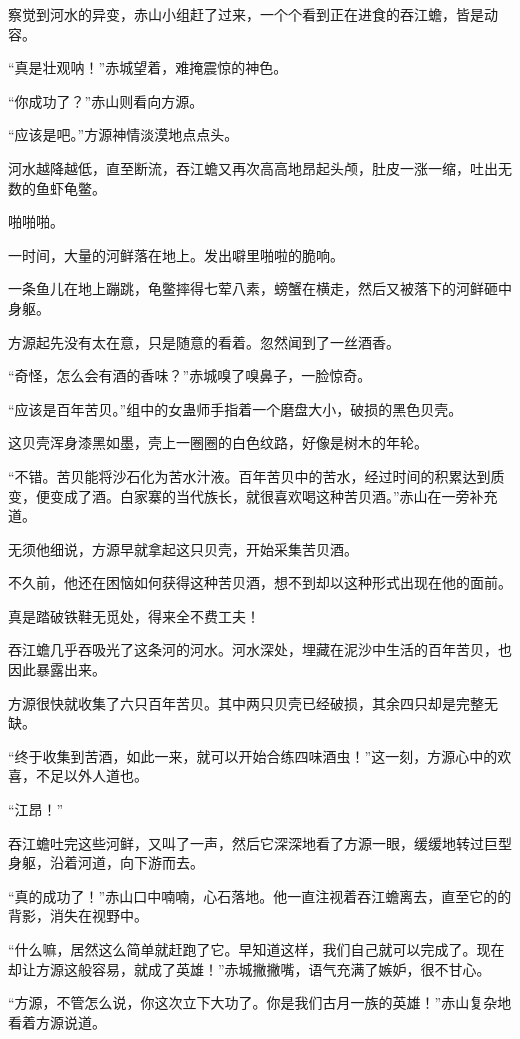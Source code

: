 \begin{this_body}
察觉到河水的异变，赤山小组赶了过来，一个个看到正在进食的吞江蟾，皆是动容。

“真是壮观呐！”赤城望着，难掩震惊的神色。

“你成功了？”赤山则看向方源。

“应该是吧。”方源神情淡漠地点点头。

河水越降越低，直至断流，吞江蟾又再次高高地昂起头颅，肚皮一涨一缩，吐出无数的鱼虾龟鳖。

啪啪啪。

一时间，大量的河鲜落在地上。发出噼里啪啦的脆响。

一条鱼儿在地上蹦跳，龟鳖摔得七荤八素，螃蟹在横走，然后又被落下的河鲜砸中身躯。

方源起先没有太在意，只是随意的看着。忽然闻到了一丝酒香。

“奇怪，怎么会有酒的香味？”赤城嗅了嗅鼻子，一脸惊奇。

“应该是百年苦贝。”组中的女蛊师手指着一个磨盘大小，破损的黑色贝壳。

这贝壳浑身漆黑如墨，壳上一圈圈的白色纹路，好像是树木的年轮。

“不错。苦贝能将沙石化为苦水汁液。百年苦贝中的苦水，经过时间的积累达到质变，便变成了酒。白家寨的当代族长，就很喜欢喝这种苦贝酒。”赤山在一旁补充道。

无须他细说，方源早就拿起这只贝壳，开始采集苦贝酒。

不久前，他还在困恼如何获得这种苦贝酒，想不到却以这种形式出现在他的面前。

真是踏破铁鞋无觅处，得来全不费工夫！

吞江蟾几乎吞吸光了这条河的河水。河水深处，埋藏在泥沙中生活的百年苦贝，也因此暴露出来。

方源很快就收集了六只百年苦贝。其中两只贝壳已经破损，其余四只却是完整无缺。

“终于收集到苦酒，如此一来，就可以开始合练四味酒虫！”这一刻，方源心中的欢喜，不足以外人道也。

“江昂！”

吞江蟾吐完这些河鲜，又叫了一声，然后它深深地看了方源一眼，缓缓地转过巨型身躯，沿着河道，向下游而去。

“真的成功了！”赤山口中喃喃，心石落地。他一直注视着吞江蟾离去，直至它的的背影，消失在视野中。

“什么嘛，居然这么简单就赶跑了它。早知道这样，我们自己就可以完成了。现在却让方源这般容易，就成了英雄！”赤城撇撇嘴，语气充满了嫉妒，很不甘心。

“方源，不管怎么说，你这次立下大功了。你是我们古月一族的英雄！”赤山复杂地看着方源说道。


\end{this_body}
